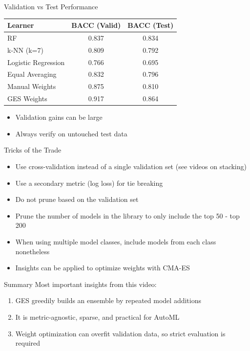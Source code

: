 \documentclass[main]{subfiles}
\begin{document}
\begin{frame}{Validation vs Test Performance}
\begin{table}[h]
\small
\centering
\begin{tabular}{lcc}
\hline
\textbf{Learner} & \textbf{BACC (Valid)} & \textbf{BACC (Test)} \\
\hline
RF & 0.837 & 0.834 \\
k-NN (k=7) & 0.809 & 0.792 \\
Logistic Regression & 0.766 & 0.695 \\
Equal Averaging & 0.832 & 0.796 \\
Manual Weights & 0.875 & 0.810 \\
GES Weights & 0.917 & 0.864 \\
\hline
\end{tabular}
\end{table}
\vspace{0.2cm}
\begin{itemize}
    \item Validation gains can be large
    \item Always verify on untouched test data
\end{itemize}
\end{frame}

\begin{frame}{Tricks of the Trade}
 \begin{itemize}
  \item Use cross-validation instead of a single validation set (see videos on stacking)
  \item Use a secondary metric (log loss) for tie breaking
  \item Do not prune based on the validation set~
  \item Prune the number of models in the library to only include the top 50 - top 200~
  \item When using multiple model classes, include models from each class nonetheless
  \item Insights can be applied to optimize weights with CMA-ES~
 \end{itemize}

\end{frame}


\begin{frame}{Summary}
Most important insights from this video:
\begin{enumerate}
    \item GES greedily builds an ensemble by repeated model additions
    \item It is metric-agnostic, sparse, and practical for AutoML
    \item Weight optimization can overfit validation data, so strict evaluation is required
\end{enumerate}
\end{frame}
\end{document}
